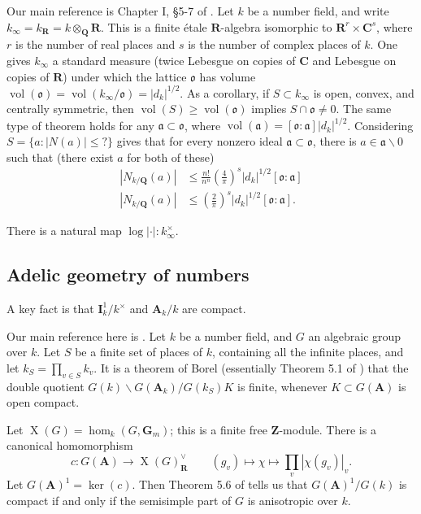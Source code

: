 \documentclass{article}
\DeclareMathOperator{\characters}{X}
\DeclareMathOperator{\volume}{vol}
\newcommand{\dA}{\mathbf{A}}
\newcommand{\dC}{\mathbf{C}}
\newcommand{\dG}{\mathbf{G}}
\newcommand{\dI}{\mathbf{I}}
\newcommand{\dQ}{\mathbf{Q}}
\newcommand{\dR}{\mathbf{R}}
\newcommand{\dZ}{\mathbf{Z}}
\newcommand{\fa}{\mathfrak{a}}
\newcommand{\fo}{\mathfrak{o}}
\theoremstyle{definition}
\begin{document}
Our main reference is Chapter I, \S5-7 of \cite{ne99}. Let $k$ be a number 
field, and write $k_\infty = k_\dR=k\otimes_\dQ \dR$. This is a finite \'etale 
$\dR$-algebra isomorphic to $\dR^r\times \dC^s$, where $r$ is the 
number of real places and $s$ is the number of complex places of $k$. One gives 
$k_\infty$ a standard measure (twice Lebesgue on copies of $\dC$ and Lebesgue 
on copies of $\dR$) under which the lattice $\fo$ has volume 
$\volume(\fo) = \volume(k_\infty/\fo) = |d_k|^{1/2}$. As a corollary, if 
$S\subset k_\infty$ is open, convex, and centrally symmetric, then 
$\volume(S) \geqslant \volume(\fo)$ implies $S\cap \fo\ne 0$. The same type of 
theorem holds for any $\fa\subset \fo$, where 
$\volume(\fa) = [\fo:\fa] |d_k|^{1/2}$. Considering $S=\{a:|N(a)| \leqslant ?\}$ 
gives that for every nonzero ideal 
$\fa\subset \fo$, there is $a\in \fa\smallsetminus 0$ such that (there exist 
$a$ for both of these) 
\begin{align*}
  |N_{k/\dQ}(a)| &\leqslant \frac{n!}{n^n}\left(\frac 4 \pi\right)^s |d_k|^{1/2} [\fo:\fa] \\
  |N_{k/\dQ}(a)| &\leqslant \left(\frac 2 \pi\right)^s |d_k|^{1/2} [\fo:\fa] .
\end{align*}

There is a natural map $\log|\cdot|:k_\infty^\times$. 


\subsection{Adelic geometry of numbers}

A key fact is that $\dI^1_k/k^\times$ and $\dA_k/k$ are compact. 

Our main reference here is \cite{pr94}. Let $k$ be a number field, and $G$ an 
algebraic group over $k$. Let $S$ be a finite set of places of $k$, containing 
all the infinite places, and let $k_S=\prod_{v\in S} k_v$. It is a theorem of 
Borel (essentially Theorem 5.1 of \cite{pr94}) that the double quotient 
$G(k)\backslash G(\dA_k) / G(k_S) K$ is finite, whenever 
$K\subset G(\dA)$ is open compact. 

Let $\characters(G)=\hom_k(G,\dG_m)$; this is a finite free $\dZ$-module. 
There is a canonical homomorphism 
\[
  c:G(\dA) \to \characters(G)_\dR^\vee \qquad (g_v) \mapsto \chi\mapsto \prod_v |\chi(g_v)|_v .
\]
Let $G(\dA)^1 = \ker(c)$. Then Theorem 5.6 of \cite{pr94} tells us that 
$G(\dA)^1 / G(k)$ is compact if and only if the semisimple part of $G$ is 
anisotropic over $k$. 
\end{document}
